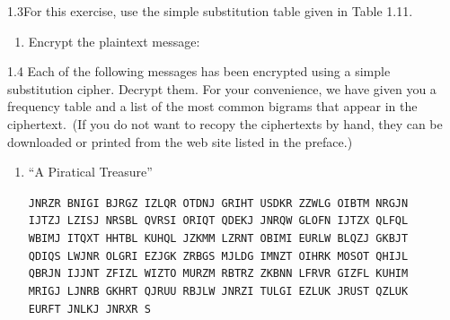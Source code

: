\begin{exercise}
    {1.3}For this exercise, use the simple substitution table given in Table 1.11.
    \begin{enumerate}
        \item Encrypt the plaintext message:
    \end{enumerate}
\end{exercise}

\vfill
\newpage

\begin{exercise}
    {1.4} Each of the following messages has been encrypted using a simple substitution cipher. Decrypt them. For your convenience, we have given you a frequency table and a list of the most common bigrams that appear in the ciphertext.\ (If you do not want to recopy the ciphertexts by hand, they can be downloaded or printed from the web site listed in the preface.)
    \begin{enumerate}
        \item “A Piratical Treasure”
              \begin{flushleft}
                  \texttt{JNRZR BNIGI BJRGZ IZLQR OTDNJ GRIHT USDKR ZZWLG OIBTM NRGJN} \\
                  \texttt{IJTZJ LZISJ NRSBL QVRSI ORIQT QDEKJ JNRQW GLOFN IJTZX QLFQL} \\
                  \texttt{WBIMJ ITQXT HHTBL KUHQL JZKMM LZRNT OBIMI EURLW BLQZJ GKBJT} \\
                  \texttt{QDIQS LWJNR OLGRI EZJGK ZRBGS MJLDG IMNZT OIHRK MOSOT QHIJL} \\
                  \texttt{QBRJN IJJNT ZFIZL WIZTO MURZM RBTRZ ZKBNN LFRVR GIZFL KUHIM} \\
                  \texttt{MRIGJ LJNRB GKHRT QJRUU RBJLW JNRZI TULGI EZLUK JRUST QZLUK} \\
                  \texttt{EURFT JNLKJ JNRXR S}
              \end{flushleft}
    \end{enumerate}
\end{exercise}

\newpage

